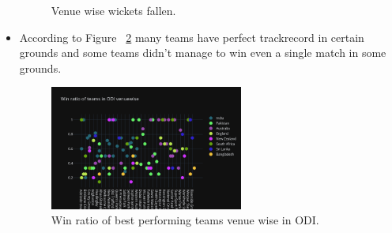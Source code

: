 \documentclass[fleqn,10pt]{wlscirep}
\begin{document}
\begin{itemize}
\begin{figure}[!htb]
        \caption{Venue wise wickets fallen.}
        \label{fig:three}
      \end{figure}
      \item According to Figure ~\ref{fig:four} many teams have perfect trackrecord in certain grounds and some teams didn't manage to win even a single match in some grounds.
      \begin{figure}[h]
        \centering
        \includegraphics[width=0.6\textwidth]{teamvenue.png}
        \caption{Win ratio of best performing teams venue wise in ODI.}
        \label{fig:four}
      \end{figure}
      

\end{itemize}
\end{document}
